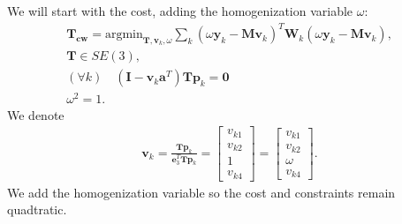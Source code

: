 \documentclass{article}
\newcommand{\mbf}[1]{\mathbf{#1}}
\newcommand{\bbm}{\begin{bmatrix}}
\newcommand{\ebm}{\end{bmatrix}}
\begin{document}
We will start with the cost, adding the homogenization variable $\omega$:
\begin{align}
\mbf{T_{cw}} = \text{argmin}_{\mbf{T}, \mbf{v}_k, \omega} \sum_k (\omega \mbf{y}_k - \mbf{M} \mbf{v}_k)^T \mbf{W}_k (\omega \mbf{y}_k - \mbf{M} \mbf{v}_k),\\
\mbf{T} \in SE(3),\\
(\forall k) \quad (\mbf{I} - \mbf{v}_k \mbf{a}^T)\mbf{T}\mbf{p}_k = \mbf{0}\\
\omega^2 = 1.
\end{align}
We denote
\begin{align}
    \mbf{v}_k = \frac{\mbf{T}\mbf{p}_k}{\mbf{e}_3^T \mbf{T} \mbf{p}_k} = \bbm
        v_{k1} \\
        v_{k2} \\
        1 \\
        v_{k4}
    \ebm = \bbm
        v_{k1} \\
        v_{k2} \\
        \omega \\
        v_{k4}
    \ebm.
\end{align}
We add the homogenization variable so the cost and constraints remain quadtratic.
\end{document}
